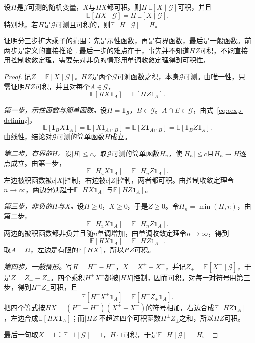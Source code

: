 \begin{theorem}[提取已知量]
\label{thm:cexp-known}
设$H$是$\mathcal{G}$可测的随机变量，$X$与$HX$都可积。则$H\,\mathbb{E}[X\mid\mathcal{G}]$可积，并且
\begin{equation}
 \mathbb{E}[HX\mid\mathcal{G}]=H\,\mathbb{E}[X\mid\mathcal{G}].
 \label{eq:cexp-known}
\end{equation}
特别地，若$H$是$\mathcal{G}$可测且可积的，则$\mathbb{E}[H\mid\mathcal{G}]=H$。
\end{theorem}

证明分三步扩大乘子的范围：先是示性函数，再是有界函数，最后是一般函数。前两步是定义的直接推论；最后一步的难点在于，事先并不知道$HZ$可积，不能直接用控制收敛定理，需要先对非负的情形用单调收敛定理得到可积性。

\begin{proof}
记$Z=\mathbb{E}[X\mid\mathcal{G}]$。$HZ$是两个$\mathcal{G}$可测函数之积，本身$\mathcal{G}$可测。由唯一性，只需证明$HZ$可积，并且对每个$A\in\mathcal{G}$，
\[
 \mathbb{E}[HX\mathbf{1}_{A}]=\mathbb{E}[HZ\mathbf{1}_{A}] .
\]

\emph{第一步，示性函数与简单函数。}设$H=\mathbf{1}_{B}$，$B\in\mathcal{G}$。$A\cap B\in\mathcal{G}$，由式~\eqref{eq:cexp-defining}，
\[
 \mathbb{E}[\mathbf{1}_{B}X\mathbf{1}_{A}]=\mathbb{E}[X\mathbf{1}_{A\cap B}]=\mathbb{E}[Z\mathbf{1}_{A\cap B}]=\mathbb{E}[\mathbf{1}_{B}Z\mathbf{1}_{A}] .
\]
由线性，结论对$\mathcal{G}$可测的简单函数$H$成立。

\emph{第二步，有界的$H$。}设$\lvert H\rvert\leq c$。取$\mathcal{G}$可测的简单函数$H_n$，使$\lvert H_n\rvert\leq c$且$H_n\to H$逐点成立。由第一步，
\[
 \mathbb{E}[H_nX\mathbf{1}_{A}]=\mathbb{E}[H_nZ\mathbf{1}_{A}] .
\]
左边被积函数被$c\lvert X\rvert$控制，右边被$c\lvert Z\rvert$控制，两者都可积。由控制收敛定理令$n\to\infty$，两边分别趋于$\mathbb{E}[HX\mathbf{1}_{A}]$与$\mathbb{E}[HZ\mathbf{1}_{A}]$。

\emph{第三步，非负的$H$与$X$。}设$H\geq0$，$X\geq0$，于是$Z\geq0$。令$H_n=\min(H,n)$，由第二步，
\[
 \mathbb{E}[H_nX\mathbf{1}_{A}]=\mathbb{E}[H_nZ\mathbf{1}_{A}] .
\]
两边的被积函数都非负并且随$n$单调增加，由单调收敛定理令$n\to\infty$，得到
\[
 \mathbb{E}[HX\mathbf{1}_{A}]=\mathbb{E}[HZ\mathbf{1}_{A}] .
\]
取$A=\Omega$，左边是有限的$\mathbb{E}[HX]$，所以$HZ$可积。

\emph{第四步，一般情形。}写$H=H^{+}-H^{-}$，$X=X^{+}-X^{-}$，并记$Z_{\pm}=\mathbb{E}[X^{\pm}\mid\mathcal{G}]$，于是$Z=Z_{+}-Z_{-}$。四个乘积$H^{\pm}X^{\pm}$都被$\lvert HX\rvert$控制，因而可积。对每一对符号用第三步，得到$H^{\pm}Z_{\pm}$可积，且
\[
 \mathbb{E}[H^{\pm}X^{\pm}\mathbf{1}_{A}]=\mathbb{E}[H^{\pm}Z_{\pm}\mathbf{1}_{A}] .
\]
把四个等式按$HX=(H^{+}-H^{-})(X^{+}-X^{-})$的符号相加，右边合成$\mathbb{E}[HZ\mathbf{1}_{A}]$，左边合成$\mathbb{E}[HX\mathbf{1}_{A}]$；而$\lvert HZ\rvert$不超过四个可积函数$H^{\pm}Z_{\pm}$之和，所以$HZ$可积。

最后一句取$X=1$：$\mathbb{E}[1\mid\mathcal{G}]=1$，$H\cdot1$可积，于是$\mathbb{E}[H\mid\mathcal{G}]=H$。
\end{proof}

